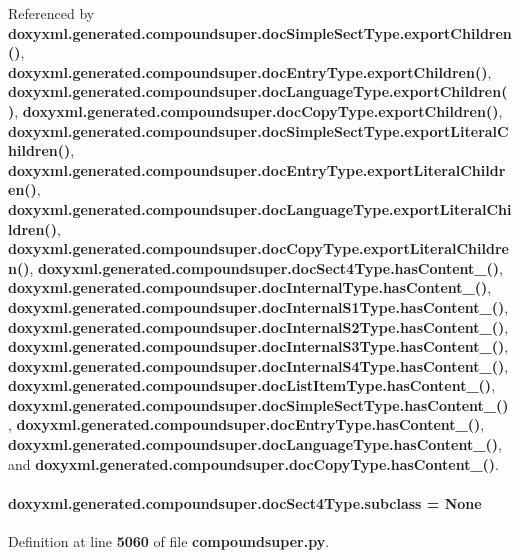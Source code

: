 Referenced by {\bf doxyxml.\+generated.\+compoundsuper.\+doc\+Simple\+Sect\+Type.\+export\+Children()}, {\bf doxyxml.\+generated.\+compoundsuper.\+doc\+Entry\+Type.\+export\+Children()}, {\bf doxyxml.\+generated.\+compoundsuper.\+doc\+Language\+Type.\+export\+Children()}, {\bf doxyxml.\+generated.\+compoundsuper.\+doc\+Copy\+Type.\+export\+Children()}, {\bf doxyxml.\+generated.\+compoundsuper.\+doc\+Simple\+Sect\+Type.\+export\+Literal\+Children()}, {\bf doxyxml.\+generated.\+compoundsuper.\+doc\+Entry\+Type.\+export\+Literal\+Children()}, {\bf doxyxml.\+generated.\+compoundsuper.\+doc\+Language\+Type.\+export\+Literal\+Children()}, {\bf doxyxml.\+generated.\+compoundsuper.\+doc\+Copy\+Type.\+export\+Literal\+Children()}, {\bf doxyxml.\+generated.\+compoundsuper.\+doc\+Sect4\+Type.\+has\+Content\+\_\+()}, {\bf doxyxml.\+generated.\+compoundsuper.\+doc\+Internal\+Type.\+has\+Content\+\_\+()}, {\bf doxyxml.\+generated.\+compoundsuper.\+doc\+Internal\+S1\+Type.\+has\+Content\+\_\+()}, {\bf doxyxml.\+generated.\+compoundsuper.\+doc\+Internal\+S2\+Type.\+has\+Content\+\_\+()}, {\bf doxyxml.\+generated.\+compoundsuper.\+doc\+Internal\+S3\+Type.\+has\+Content\+\_\+()}, {\bf doxyxml.\+generated.\+compoundsuper.\+doc\+Internal\+S4\+Type.\+has\+Content\+\_\+()}, {\bf doxyxml.\+generated.\+compoundsuper.\+doc\+List\+Item\+Type.\+has\+Content\+\_\+()}, {\bf doxyxml.\+generated.\+compoundsuper.\+doc\+Simple\+Sect\+Type.\+has\+Content\+\_\+()}, {\bf doxyxml.\+generated.\+compoundsuper.\+doc\+Entry\+Type.\+has\+Content\+\_\+()}, {\bf doxyxml.\+generated.\+compoundsuper.\+doc\+Language\+Type.\+has\+Content\+\_\+()}, and {\bf doxyxml.\+generated.\+compoundsuper.\+doc\+Copy\+Type.\+has\+Content\+\_\+()}.

\paragraph[{subclass}]{\setlength{\rightskip}{0pt plus 5cm}doxyxml.\+generated.\+compoundsuper.\+doc\+Sect4\+Type.\+subclass = None\hspace{0.3cm}{\ttfamily [static]}}\label{classdoxyxml_1_1generated_1_1compoundsuper_1_1docSect4Type_a35a3c6590d868df1c2afaf4d623a662b}


Definition at line {\bf 5060} of file {\bf compoundsuper.\+py}.

